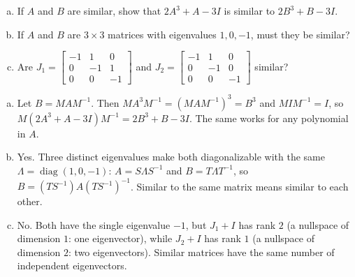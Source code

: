 \begin{exercise}\label{exr:u32-recitation}
\begin{enumerate}[(a)]
  \item If $A$ and $B$ are similar, show that $2A^3+A-3I$ is similar to $2B^3+B-3I$.
  \item If $A$ and $B$ are $3\times3$ matrices with eigenvalues $1,0,-1$, must they be similar?
  \item Are $J_1=\left[\begin{smallmatrix}-1&1&0\\0&-1&1\\0&0&-1\end{smallmatrix}\right]$ and
        $J_2=\left[\begin{smallmatrix}-1&1&0\\0&-1&0\\0&0&-1\end{smallmatrix}\right]$ similar?
\end{enumerate}
\end{exercise}
\begin{solution}
\begin{enumerate}[(a)]
  \item Let $B=MAM^{-1}$. Then $MA^3M^{-1}=(MAM^{-1})^3=B^3$ and $MIM^{-1}=I$, so
        $M(2A^3+A-3I)M^{-1}=2B^3+B-3I$. The same works for any polynomial in $A$.
  \item Yes. Three distinct eigenvalues make both diagonalizable with the same
        $\Lambda=\operatorname{diag}(1,0,-1)$: $A=S\Lambda S^{-1}$ and $B=T\Lambda T^{-1}$, so
        $B=(TS^{-1})A(TS^{-1})^{-1}$. Similar to the same matrix means similar to each other.
  \item No. Both have the single eigenvalue $-1$, but $J_1+I$ has rank $2$ (a nullspace of
        dimension $1$: one eigenvector), while $J_2+I$ has rank $1$ (a nullspace of dimension $2$:
        two eigenvectors). Similar matrices have the same number of independent eigenvectors.
\end{enumerate}
\end{solution}

